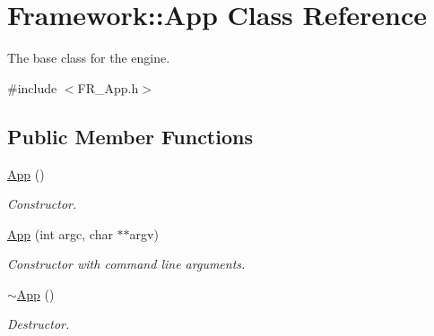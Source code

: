 \hypertarget{classFramework_1_1App}{
\section{Framework::App Class Reference}
\label{classFramework_1_1App}
}


The base class for the engine.  


{\ttfamily \#include $<$FR\_\-App.h$>$}\subsection*{Public Member Functions}
\begin{DoxyCompactItemize}
\item 
\hypertarget{classFramework_1_1App_a5f7d9ef4ad19c6d40bce28af2af36139}{
\hyperlink{classFramework_1_1App_a5f7d9ef4ad19c6d40bce28af2af36139}{App} ()}
\label{classFramework_1_1App_a5f7d9ef4ad19c6d40bce28af2af36139}

\begin{DoxyCompactList}\small\item\em Constructor. \item\end{DoxyCompactList}\item 
\hypertarget{classFramework_1_1App_aad88a2ecb9c2be306cf0a609d9d83a09}{
\hyperlink{classFramework_1_1App_aad88a2ecb9c2be306cf0a609d9d83a09}{App} (int argc, char $\ast$$\ast$argv)}
\label{classFramework_1_1App_aad88a2ecb9c2be306cf0a609d9d83a09}

\begin{DoxyCompactList}\small\item\em Constructor with command line arguments. \item\end{DoxyCompactList}\item 
\hypertarget{classFramework_1_1App_acbbcd57583869ac1a15cec2b522e4c37}{
\hyperlink{classFramework_1_1App_acbbcd57583869ac1a15cec2b522e4c37}{$\sim$App} ()}
\label{classFramework_1_1App_acbbcd57583869ac1a15cec2b522e4c37}

\begin{DoxyCompactList}\small\item\em Destructor. \item\end{DoxyCompactList}\end{DoxyCompactItemize}
